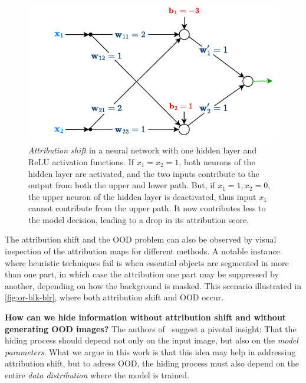 \begin{figure}[t]
 \centering
 \includegraphics[width=1.\linewidth]{fig/1.pdf}
 \caption{\emph{Attribution shift} in a neural network with one hidden layer and ReLU activation functions. If $x_1=x_2=1$, both neurons of the hidden layer are activated, and the two inputs contribute to the output from both the upper and lower path. But, if $x_1=1, x_2=0$, the upper neuron of the hidden layer is deactivated, thus input $x_1$ cannot contribute from the upper path. It now contributes less to the model decision, leading to a drop in its attribution score.}
 \label{fig:simple-dnn}
\end{figure}

The attribution shift and the OOD problem can also be observed by visual inspection of the attribution maps for different methods. A notable instance where heuristic techniques fail is when essential objects are segmented in more than one part, in which case the attribution one part may be suppressed by another, depending on how the background is masked. This scenario illustrated in \autoref{fig:or-blk-blr}, where both attribution shift and OOD occur.

\textbf{How can we hide information without attribution shift and without generating OOD images?} The authors of~\citep{Izzo_2021} suggest a pivotal insight: That the hiding process should depend not only on the input image, but also on the \emph{model parameters}. What we argue in this work is that this idea may help in addressing attribution shift, but to adress OOD, the hiding process must also depend on the entire \emph{data distribution} where the model is trained.

